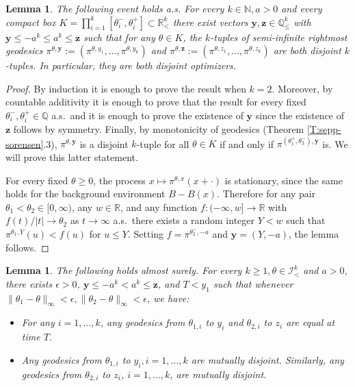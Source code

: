 \documentclass[11pt]{article}
\newcommand{\Q}{\mathbb{Q}}
\newcommand{\N}{\mathbb{N}}
\newcommand{\R}{\mathbb{R}}
\newcommand{\ep}{\epsilon}
\newcommand{\cI}{\mathcal{I}}
\newcommand{\by}{\mathbf{y}}
\newcommand{\bz}{\mathbf{z}}
\newtheorem{lemma}[theorem]{Lemma}
\theoremstyle{definition} %
\theoremstyle{remark} %
\begin{document}
\begin{lemma}
	\label{L:disjoint-geods}
	The following event holds a.s. For every $k \in \N, a > 0$ and every compact box $K = \prod_{i=1}^k [\theta_i^-, \theta_i^+]\subset \R^k_<$ there exist vectors $\by, \bz \in \Q^k_\le$ with $\by \le -a^k \le a^k \le \bz$ such that for any $\theta \in K$, the $k$-tuples of semi-infinite rightmost geodesics $\pi^{\theta, \by} := (\pi^{\theta, y_1}, \dots, \pi^{\theta, y_k})$ and $\pi^{\theta, \bz} := (\pi^{\theta, z_1}, \dots, \pi^{\theta, z_k})$ are both disjoint $k$-tuples. In particular, they are both  disjoint optimizers.
\end{lemma}

\begin{proof}
By induction it is enough to prove the result when $k = 2$. Moreover, by countable additivity it is enough to prove that the result for every fixed $\theta_i^-, \theta_i^+ \in \Q$ a.s.\ and it is enough to prove the existence of $\by$ since the existence of $\bz$ follows by symmetry. Finally, by monotonicity of geodesics (Theorem \ref{T:sepp-sorensen}.3), $\pi^{\theta, \by}$ is a disjoint $k$-tuple for all $\theta \in K$ if and only if $\pi^{(\theta_1^+, \theta_2^-), \by}$ is. We will prove this latter statement.
	
	For every fixed $\theta \ge 0$, the process $x \mapsto \pi^{\theta, x}(x + \cdot)$ is stationary, since the same holds for the background environment $B - B(x)$. Therefore for any pair $\theta_1 < \theta_2 \in [0, \infty)$, any $w \in \R$, and any function $f:(-\infty, w] \to \R$ with $f(t)/|t| \to \theta_2$ as $t \to \infty$ a.s.\ there exists a random integer $Y < w$ such that $\pi^{\theta_1, Y}(u) < f(u)$ for $u \le Y$. Setting $f = \pi^{\theta_2^-, -a}$ and $\by = (Y, - a)$, the lemma follows.
\end{proof}

\begin{lemma}
	\label{L:optimal-coal}
	The following holds almost surely. For every $k \ge 1, \theta \in \cI^k_<$ and $a > 0$, there exists $\ep > 0$, $\by \le -a^k < a^k \le \bz$, and $T < y_1$ such that whenever $\|\theta_1 - \theta\|_\infty < \ep, \|\theta_2 - \theta\|_\infty < \ep$, we have:
	\begin{itemize}
		\item For any $i = 1, \dots, k$, any geodesics from $\theta_{1, i}$ to $y_i$ and $\theta_{2, i}$ to $z_i$ are equal at time $T$.
		\item Any geodesics from $\theta_{1, i}$ to $y_i, i = 1, \dots, k$ are mutually disjoint. Similarly, any geodesics from $\theta_{2, i}$ to $z_i$, $i=1, \dots, k$, are  mutually disjoint.
	\end{itemize}
\end{lemma}
\end{document}
